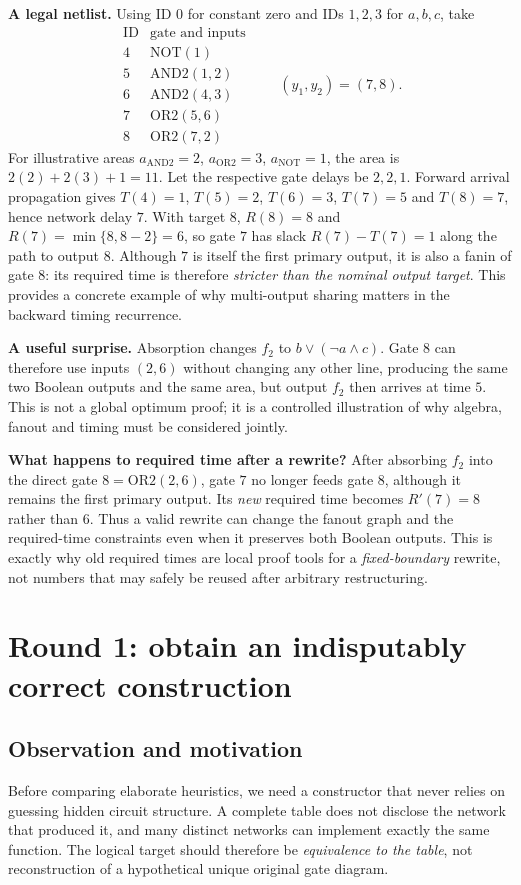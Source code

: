 \textbf{A legal netlist.} Using ID $0$ for constant zero and IDs $1,2,3$ for $a,b,c$, take
\[
\begin{array}{c|l}
\text{ID}&\text{gate and inputs}\\\hline
4&\mathrm{NOT}(1)\\
5&\mathrm{AND2}(1,2)\\
6&\mathrm{AND2}(4,3)\\
7&\mathrm{OR2}(5,6)\\
8&\mathrm{OR2}(7,2)
\end{array}
\qquad(y_1,y_2)=(7,8).
\]
For illustrative areas $a_{\mathrm{AND2}}=2$, $a_{\mathrm{OR2}}=3$, $a_{\mathrm{NOT}}=1$, the area is $2(2)+2(3)+1=11$. Let the respective gate delays be $2,2,1$. Forward arrival propagation gives $T(4)=1$, $T(5)=2$, $T(6)=3$, $T(7)=5$ and $T(8)=7$, hence network delay $7$. With target $8$, $R(8)=8$ and $R(7)=\min\{8,8-2\}=6$, so gate $7$ has slack $R(7)-T(7)=1$ along the path to output $8$. Although $7$ is itself the first primary output, it is also a fanin of gate $8$: its required time is therefore \emph{stricter than the nominal output target}. This provides a concrete example of why multi-output sharing matters in the backward timing recurrence.

\textbf{A useful surprise.} Absorption changes $f_2$ to $b\lor(\neg a\land c)$. Gate $8$ can therefore use inputs $(2,6)$ without changing any other line, producing the same two Boolean outputs and the same area, but output $f_2$ then arrives at time $5$. This is not a global optimum proof; it is a controlled illustration of why algebra, fanout and timing must be considered jointly.

\textbf{What happens to required time after a rewrite?} After absorbing $f_2$ into the direct gate $8=\mathrm{OR2}(2,6)$, gate $7$ no longer feeds gate $8$, although it remains the first primary output. Its \emph{new} required time becomes $R'(7)=8$ rather than $6$. Thus a valid rewrite can change the fanout graph and the required-time constraints even when it preserves both Boolean outputs. This is exactly why old required times are local proof tools for a \emph{fixed-boundary} rewrite, not numbers that may safely be reused after arbitrary restructuring.

\section{Round 1: obtain an indisputably correct construction}
\subsection{Observation and motivation}
Before comparing elaborate heuristics, we need a constructor that never relies on guessing hidden circuit structure. A complete table does not disclose the network that produced it, and many distinct networks can implement exactly the same function. The logical target should therefore be \emph{equivalence to the table}, not reconstruction of a hypothetical unique original gate diagram.

